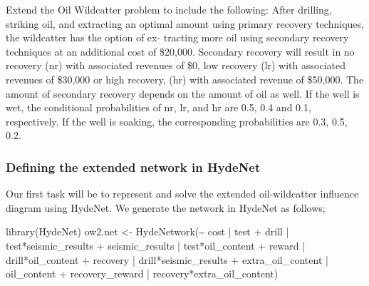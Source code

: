 \documentclass[
]{article}
\newenvironment{Shaded}{\begin{snugshade}}{\end{snugshade}}
\newcommand{\FunctionTok}[1]{\textcolor[rgb]{0.00,0.00,0.00}{#1}}
\newcommand{\NormalTok}[1]{#1}
\newcommand{\OtherTok}[1]{\textcolor[rgb]{0.56,0.35,0.01}{#1}}
\newcommand{\SpecialCharTok}[1]{\textcolor[rgb]{0.00,0.00,0.00}{#1}}
\begin{document}
Extend the Oil Wildcatter problem to include the following: After drilling, striking oil, and extracting an optimal amount using primary recovery techniques, the wildcatter has the option of ex- tracting more oil using secondary recovery techniques at an additional cost of \$20,000. Secondary recovery will result in no recovery (nr) with associated revenues of \$0, low recovery (lr) with associated revenues of \$30,000 or high recovery, (hr) with associated revenue of \$50,000. The amount of secondary recovery depends on the amount of oil as well. If the well is wet, the conditional probabilities of nr, lr, and hr are 0.5, 0.4 and 0.1, respectively. If the well is soaking, the corresponding probabilities are 0.3, 0.5, 0.2.

\hypertarget{defining-the-extended-network-in-hydenet-1}{%
\subsubsection{Defining the extended network in HydeNet}\label{defining-the-extended-network-in-hydenet-1}}

Our first task will be to represent and solve the extended oil-wildcatter influence diagram using HydeNet. We generate the network in HydeNet as follows;

\begin{Shaded}
\begin{Highlighting}[]
\FunctionTok{library}\NormalTok{(HydeNet)}
\NormalTok{ow2.net }\OtherTok{\textless{}{-}} \FunctionTok{HydeNetwork}\NormalTok{(}\SpecialCharTok{\textasciitilde{}}\NormalTok{ cost }\SpecialCharTok{|}\NormalTok{ test }
                      \SpecialCharTok{+}\NormalTok{ drill }\SpecialCharTok{|}\NormalTok{ test}\SpecialCharTok{*}\NormalTok{seismic\_results }
                      \SpecialCharTok{+}\NormalTok{ seismic\_results }\SpecialCharTok{|}\NormalTok{ test}\SpecialCharTok{*}\NormalTok{oil\_content }
                      \SpecialCharTok{+}\NormalTok{ reward }\SpecialCharTok{|}\NormalTok{ drill}\SpecialCharTok{*}\NormalTok{oil\_content }
                      \SpecialCharTok{+}\NormalTok{ recovery }\SpecialCharTok{|}\NormalTok{ drill}\SpecialCharTok{*}\NormalTok{seismic\_results}
                      \SpecialCharTok{+}\NormalTok{ extra\_oil\_content }\SpecialCharTok{|}\NormalTok{ oil\_content}
                      \SpecialCharTok{+}\NormalTok{ recovery\_reward }\SpecialCharTok{|}\NormalTok{ recovery}\SpecialCharTok{*}\NormalTok{extra\_oil\_content)}
\end{Highlighting}
\end{Shaded}
\end{document}
